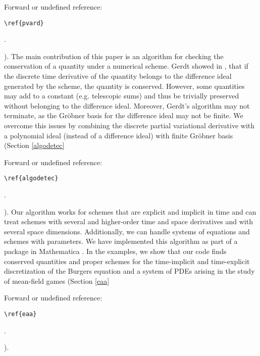 \documentclass[sigconf,twocolumn]{acmart}
\newcommand{\1}{{\chi}}
\numberwithin{equation}{section}
\theoremstyle{thmlemcorr}
\numberwithin{theorem}{section}
\theoremstyle{thmlemcorr*}
\theoremstyle{defi}
\theoremstyle{remexample}
\theoremstyle{ass}
\begin{document}
 {\color{red} Forward or undefined reference: \begin{verbatim}\ref{pvard}\end{verbatim}.}
).
The main contribution of this paper is an algorithm for checking the conservation of a quantity under a numerical scheme.
Gerdt showed in \cite{gerdt12}, that if the discrete time derivative of the quantity belongs to the difference ideal generated by the scheme, the quantity is conserved. However, some quantities may add to a constant (e.g. telescopic sums) and thus be trivially preserved without belonging to the difference ideal. Moreover, Gerdt's algorithm may not terminate, as the Gr{\"o}bner basis for the difference ideal may not be finite.
We overcome this issues by combining the discrete partial variational derivative with a polynomial ideal (instead of a difference ideal) with finite Gr{\"o}bner basis (Section \ref{algodetec}
 {\color{red} Forward or undefined reference: \begin{verbatim}\ref{algodetec}\end{verbatim}.}
). 
Our algorithm works for schemes that are explicit and implicit in time and can treat schemes with several and higher-order time  and space derivatives and with several space dimensions.
Additionally, we can handle systems of equations and schemes with parameters. 
We have implemented this algorithm as part of a package in {\sc Mathematica} \cite{wolfram21}.
In the examples, we show that our code finds conserved quantities and proper schemes for the time-implicit and time-explicit discretization of the Burgers equation and a system of PDEs arising in the study of mean-field games (Section \ref{eaa}
 {\color{red} Forward or undefined reference: \begin{verbatim}\ref{eaa}\end{verbatim}.}
).
\end{document}
